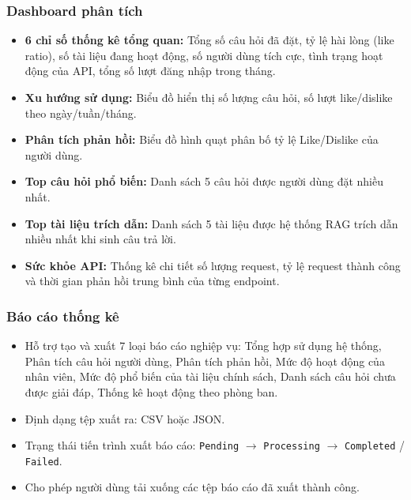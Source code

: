 \documentclass[12pt,a4paper]{report}
\begin{document}
\subsubsection{Dashboard phân tích}
\begin{itemize}
    \item \textbf{6 chỉ số thống kê tổng quan:} Tổng số câu hỏi đã đặt, tỷ lệ hài lòng (like ratio), số tài liệu đang hoạt động, số người dùng tích cực, tình trạng hoạt động của API, tổng số lượt đăng nhập trong tháng.
    \item \textbf{Xu hướng sử dụng:} Biểu đồ hiển thị số lượng câu hỏi, số lượt like/dislike theo ngày/tuần/tháng.
    \item \textbf{Phân tích phản hồi:} Biểu đồ hình quạt phân bố tỷ lệ Like/Dislike của người dùng.
    \item \textbf{Top câu hỏi phổ biến:} Danh sách 5 câu hỏi được người dùng đặt nhiều nhất.
    \item \textbf{Top tài liệu trích dẫn:} Danh sách 5 tài liệu được hệ thống RAG trích dẫn nhiều nhất khi sinh câu trả lời.
    \item \textbf{Sức khỏe API:} Thống kê chi tiết số lượng request, tỷ lệ request thành công và thời gian phản hồi trung bình của từng endpoint.
\end{itemize}

\subsubsection{Báo cáo thống kê}
\begin{itemize}
    \item Hỗ trợ tạo và xuất 7 loại báo cáo nghiệp vụ: Tổng hợp sử dụng hệ thống, Phân tích câu hỏi người dùng, Phân tích phản hồi, Mức độ hoạt động của nhân viên, Mức độ phổ biến của tài liệu chính sách, Danh sách câu hỏi chưa được giải đáp, Thống kê hoạt động theo phòng ban.
    \item Định dạng tệp xuất ra: CSV hoặc JSON.
    \item Trạng thái tiến trình xuất báo cáo: \texttt{Pending} $\rightarrow$ \texttt{Processing} $\rightarrow$ \texttt{Completed} / \texttt{Failed}.
    \item Cho phép người dùng tải xuống các tệp báo cáo đã xuất thành công.
\end{itemize}
\end{document}
